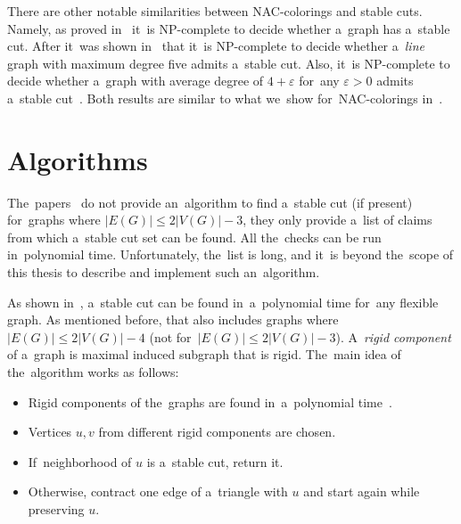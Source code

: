 There are other notable similarities between NAC-colorings and stable cuts.
Namely, as proved in~\cite{stable_cuts_complexity_base} it~is NP-complete
to decide whether a~graph has a~stable cut.
After it~was shown in~\cite{stable_cuts_complexity_deg_five} that
it~is NP-complete to decide whether a~\emph{line} graph with maximum degree five
admits a~stable cut.
%
Also, it~is NP-complete to decide whether a~graph with average degree of
$4+\varepsilon$ for~any $\varepsilon > 0$ admits a~stable cut~\cite{stable_cuts_complexity_deg_five}.
Both results are similar to what we~show for~NAC-colorings in~.
%

\section{Algorithms}%
\label{sec:stable_cut_algo}

The~papers~\cite{stable_cuts_2v_3,stable_cuts_2v_3_revisit} do not provide
an~algorithm to find a~stable cut (if present)
for~graphs where \(|E(G)| \le 2|V(G)|-3 \),
they only provide a~list of claims
from which a~stable cut set can be found.
All the~checks can be run in~polynomial time.
Unfortunately, the~list is long,
and it~is beyond the~scope of this thesis
to describe and implement such an~algorithm.

As shown in~\cite[Algorithm 1]{stable_cuts_legersky}, a~stable cut can be found
in~a~polynomial time for~any flexible graph.
As mentioned before, that also includes graphs
where \( |E(G)| \le 2|V(G)| - 4 \) (not for~\( |E(G)| \le 2|V(G)| - 3 \)).
A~\emph{rigid component} of a~graph is maximal induced subgraph that is rigid.
The~main idea of the~algorithm works as follows:
%
\begin{itemize}
	\item Rigid components of the~graphs are found in~a~polynomial time~\cite{rigid_components_pebble_game}.
	\item Vertices \( u, v \) from different rigid components are chosen.
	\item If~neighborhood of \( u \) is a~stable cut, return it.
	\item Otherwise, contract one edge of a~triangle with \( u \) and start again while preserving \( u \).
\end{itemize}

